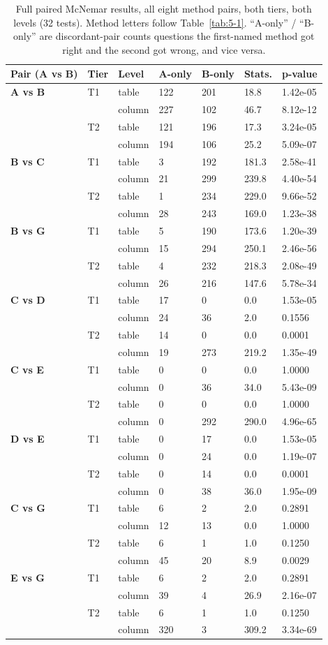 \begin{table}[htbp]
\centering
\caption{Full paired McNemar results, all eight method pairs, both tiers, both levels (32 tests). Method letters follow Table~\ref{tab:5-1}. ``A-only'' / ``B-only'' are discordant-pair counts questions the first-named method got right and the second got wrong, and vice versa.}\label{tab:5-4}
\small\setlength{\tabcolsep}{4pt}
\begin{tabular}{@{}lllllll@{}}
\toprule
\textbf{Pair (A vs B)} & \textbf{Tier} & \textbf{Level} & \textbf{A-only} & \textbf{B-only} & \textbf{Stats.} & \textbf{p-value}\tabularnewline
\midrule
\textbf{A vs B} & T1 & table & 122 & 201 & 18.8 & 1.42e-05\tabularnewline
& & column & 227 & 102 & 46.7 & 8.12e-12\tabularnewline
& T2 & table & 121 & 196 & 17.3 & 3.24e-05\tabularnewline
& & column & 194 & 106 & 25.2 & 5.09e-07\tabularnewline
\textbf{B vs C} & T1 & table & 3 & 192 & 181.3 & 2.58e-41\tabularnewline
& & column & 21 & 299 & 239.8 & 4.40e-54\tabularnewline
& T2 & table & 1 & 234 & 229.0 & 9.66e-52\tabularnewline
& & column & 28 & 243 & 169.0 & 1.23e-38\tabularnewline
\textbf{B vs G} & T1 & table & 5 & 190 & 173.6 & 1.20e-39\tabularnewline
& & column & 15 & 294 & 250.1 & 2.46e-56\tabularnewline
& T2 & table & 4 & 232 & 218.3 & 2.08e-49\tabularnewline
& & column & 26 & 216 & 147.6 & 5.78e-34\tabularnewline
\textbf{C vs D} & T1 & table & 17 & 0 & 0.0 & 1.53e-05\tabularnewline
& & column & 24 & 36 & 2.0 & 0.1556\tabularnewline
& T2 & table & 14 & 0 & 0.0 & 0.0001\tabularnewline
& & column & 19 & 273 & 219.2 & 1.35e-49\tabularnewline
\textbf{C vs E} & T1 & table & 0 & 0 & 0.0 & 1.0000\tabularnewline
& & column & 0 & 36 & 34.0 & 5.43e-09\tabularnewline
& T2 & table & 0 & 0 & 0.0 & 1.0000\tabularnewline
& & column & 0 & 292 & 290.0 & 4.96e-65\tabularnewline
\textbf{D vs E} & T1 & table & 0 & 17 & 0.0 & 1.53e-05\tabularnewline
& & column & 0 & 24 & 0.0 & 1.19e-07\tabularnewline
& T2 & table & 0 & 14 & 0.0 & 0.0001\tabularnewline
& & column & 0 & 38 & 36.0 & 1.95e-09\tabularnewline
\textbf{C vs G} & T1 & table & 6 & 2 & 2.0 & 0.2891\tabularnewline
& & column & 12 & 13 & 0.0 & 1.0000\tabularnewline
& T2 & table & 6 & 1 & 1.0 & 0.1250\tabularnewline
& & column & 45 & 20 & 8.9 & 0.0029\tabularnewline
\textbf{E vs G} & T1 & table & 6 & 2 & 2.0 & 0.2891\tabularnewline
& & column & 39 & 4 & 26.9 & 2.16e-07\tabularnewline
& T2 & table & 6 & 1 & 1.0 & 0.1250\tabularnewline
& & column & 320 & 3 & 309.2 & 3.34e-69\tabularnewline
\bottomrule
\end{tabular}
\end{table}






